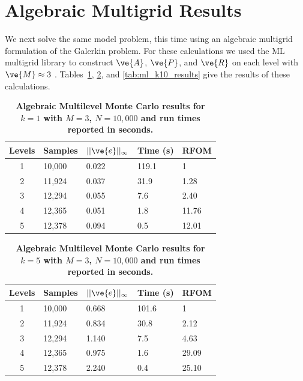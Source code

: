\documentclass[note]{TechNote}
\begin{document}
\section{Algebraic Multigrid Results}
\label{sec:algebraic_results}
We next solve the same model problem, this time using an algebraic
multigrid formulation of the Galerkin problem. For these calculations
we used the ML multigrid library to construct $\ve{A}$, $\ve{P}$, and
$\ve{R}$ on each level with $\ve{M} \approx 3$
\cite{ml_manual}. Tables~\ref{tab:ml_k1_results},
\ref{tab:ml_k5_results}, and \ref{tab:ml_k10_results} give the results
of these calculations.
\begin{table}[h!]
  \begin{center}
    \begin{tabular}{cllll}\hline\hline
      \multicolumn{1}{c}{\textbf{Levels}} & 
      \multicolumn{1}{l}{\textbf{Samples}} & 
      \multicolumn{1}{l}{\textbf{$||\ve{e}||_{\infty}$}} & 
      \multicolumn{1}{l}{\textbf{Time (s)}} & 
      \multicolumn{1}{l}{\textbf{RFOM}} \\
      \hline
      1 & 10,000 & 0.022 & 119.1 & 1 \\
      2 & 11,924 & 0.037 & 31.9 & 1.28 \\
      3 & 12,294 & 0.055 & 7.6 & 2.40 \\
      4 & 12,365 & 0.051 & 1.8 & 11.76 \\
      5 & 12,378 & 0.094 & 0.5 & 12.01 \\
      \hline\hline
    \end{tabular}
  \end{center}
  \caption{\textbf{Algebraic Multilevel Monte Carlo results for $k =
      1$ with $M = 3$, $N = 10,000$ and run times reported in
      seconds.}}
  \label{tab:ml_k1_results}
\end{table}
\begin{table}[h!]
  \begin{center}
    \begin{tabular}{cllll}\hline\hline
      \multicolumn{1}{c}{\textbf{Levels}} & 
      \multicolumn{1}{l}{\textbf{Samples}} & 
      \multicolumn{1}{l}{\textbf{$||\ve{e}||_{\infty}$}} & 
      \multicolumn{1}{l}{\textbf{Time (s)}} & 
      \multicolumn{1}{l}{\textbf{RFOM}} \\
      \hline
      1 & 10,000 & 0.668 & 101.6 & 1 \\
      2 & 11,924 & 0.834 & 30.8 & 2.12 \\
      3 & 12,294 & 1.140 & 7.5 & 4.63 \\
      4 & 12,365 & 0.975 & 1.6 & 29.09 \\
      5 & 12,378 & 2.240 & 0.4 & 25.10 \\
      \hline\hline
    \end{tabular}
  \end{center}
  \caption{\textbf{Algebraic Multilevel Monte Carlo results for $k =
      5$ with $M = 3$, $N = 10,000$ and run times reported in
      seconds.}}
  \label{tab:ml_k5_results}
\end{table}
\end{document}
